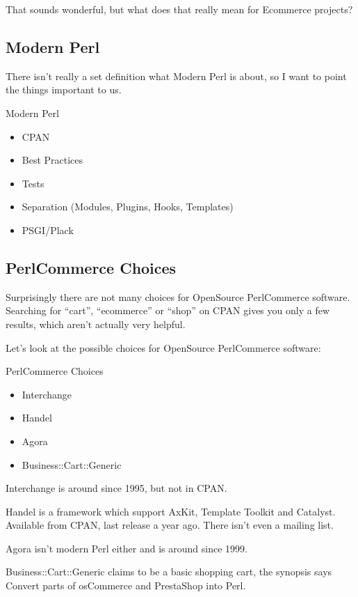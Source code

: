 That sounds wonderful, but what does that really mean for Ecommerce
projects?

\subsection{Modern Perl}
There isn't really a set definition what Modern Perl is about,
so I want to point the things important to us.

\begin{frame}{Modern Perl}
\begin{itemize}
\item CPAN
\item Best Practices
\item Tests
\item Separation (Modules, Plugins, Hooks, Templates)
\item PSGI/Plack
\end{itemize}
\end{frame}

\subsection{PerlCommerce Choices}
Surprisingly there are not many choices for OpenSource PerlCommerce
software. Searching for ``cart'', ``ecommerce'' or ``shop'' on CPAN
gives you only a few results, which aren't actually very helpful.

Let's look at the possible choices for OpenSource PerlCommerce software:

\begin{frame}{PerlCommerce Choices}
\begin{itemize}
\item Interchange
\item Handel
\item Agora
\item Business::Cart::Generic
\end{itemize}
\end{frame}

Interchange is around since 1995, but not in CPAN.

Handel is a framework which support AxKit, Template Toolkit 
and Catalyst.
Available from CPAN, last release a year ago.
There isn't even a mailing list.

Agora isn't modern Perl either and is around since 1999.

Business::Cart::Generic claims to be a basic shopping cart,
the synopsis says Convert parts of osCommerce and PrestaShop into
Perl.

